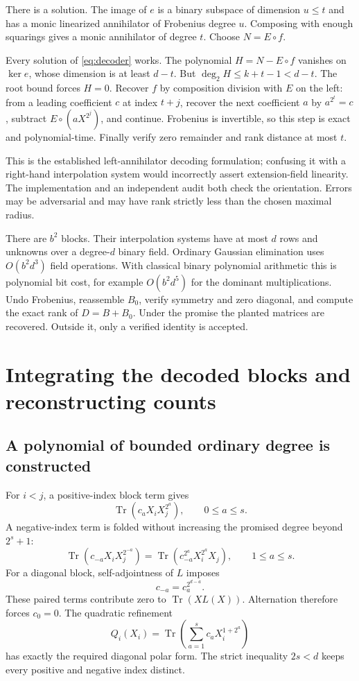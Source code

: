 \documentclass[11pt]{article}
\theoremstyle{remark}\newtheorem{remark}[theorem]{Remark}
\newcommand{\Tr}{\operatorname{Tr}}
\begin{document}
There is a solution. The image of $e$ is a binary subspace of dimension $u\le t$ and has a monic linearized annihilator of Frobenius degree $u$. Composing with enough squarings gives a monic annihilator of degree $t$. Choose $N=E\circ f$.

Every solution of \eqref{eq:decoder} works. The polynomial $H=N-E\circ f$ vanishes on $\ker e$, whose dimension is at least $d-t$. But $\deg_2 H\le k+t-1<d-t$. The root bound forces $H=0$. Recover $f$ by composition division with $E$ on the left: from a leading coefficient $c$ at index $t+j$, recover the next coefficient $a$ by $a^{2^t}=c$, subtract $E\circ(aX^{2^j})$, and continue. Frobenius is invertible, so this step is exact and polynomial-time. Finally verify zero remainder and rank distance at most $t$.

This is the established left-annihilator decoding formulation; confusing it with a right-hand interpolation system would incorrectly assert extension-field linearity. The implementation and an independent audit both check the orientation. Errors may be adversarial and may have rank strictly less than the chosen maximal radius.

There are $b^2$ blocks. Their interpolation systems have at most $d$ rows and unknowns over a degree-$d$ binary field. Ordinary Gaussian elimination uses $O(b^2d^3)$ field operations. With classical binary polynomial arithmetic this is polynomial bit cost, for example $O(b^2d^5)$ for the dominant multiplications. Undo Frobenius, reassemble $B_0$, verify symmetry and zero diagonal, and compute the exact rank of $D=B+B_0$. Under the promise the planted matrices are recovered. Outside it, only a verified identity is accepted.

\section{Integrating the decoded blocks and reconstructing counts}
\subsection{A polynomial of bounded ordinary degree is constructed}
For $i<j$, a positive-index block term gives
\[
 \Tr(c_aX_iX_j^{2^a}),\qquad 0\le a\le s.
\]
A negative-index term is folded without increasing the promised degree beyond $2^s+1$:
\[
 \Tr(c_{-a}X_iX_j^{2^{-a}})
 =\Tr(c_{-a}^{2^a}X_i^{2^a}X_j),\qquad 1\le a\le s.
\]
For a diagonal block, self-adjointness of $L$ imposes
\[
 c_{-a}=c_a^{2^{d-a}}.
\]
These paired terms contribute zero to $\Tr(XL(X))$. Alternation therefore forces $c_0=0$. The quadratic refinement
\[
 Q_i(X_i)=\Tr\left(\sum_{a=1}^{s}c_aX_i^{1+2^a}\right)
\]
has exactly the required diagonal polar form. The strict inequality $2s<d$ keeps every positive and negative index distinct.
\end{document}
